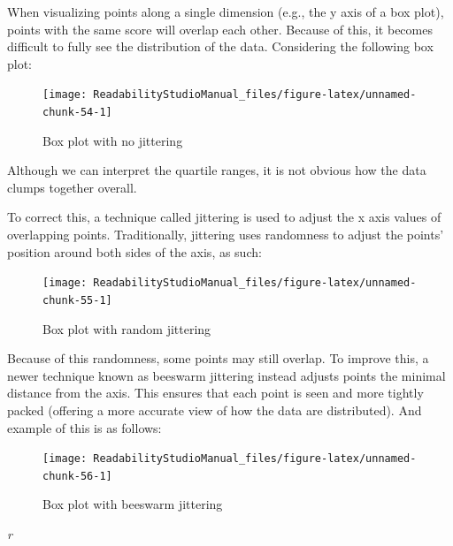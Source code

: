 \documentclass[
]{book}
\newenvironment{glsterm}
  {
  \bfseries
  }
  {
  }
\newenvironment{glsdef}
  {
  \noindent
  \flushleft
  \begin{adjustwidth}{2cm}{}
  }
  {
  \end{adjustwidth}
  }
\theoremstyle{definition}
\theoremstyle{definition}
\theoremstyle{definition}
\theoremstyle{definition}
\theoremstyle{remark}
\begin{document}
\begin{glsdef}

When visualizing points along a single dimension (e.g., the y axis of a box plot), points with the same score will overlap each other. Because of this, it becomes difficult to fully see the distribution of the data. Considering the following box plot:

\begin{figure}[H]

{\centering \texttt{[image: ReadabilityStudioManual\_files/figure-latex/unnamed-chunk-54-1]} 

}

\caption{Box plot with no jittering}\label{fig:unnamed-chunk-54}
\end{figure}

Although we can interpret the quartile ranges, it is not obvious how the data clumps together overall.

To correct this, a technique called jittering is used to adjust the x axis values of overlapping points. Traditionally, jittering uses randomness to adjust the points' position around both sides of the axis, as such:

\begin{figure}[H]

{\centering \texttt{[image: ReadabilityStudioManual\_files/figure-latex/unnamed-chunk-55-1]} 

}

\caption{Box plot with random jittering}\label{fig:unnamed-chunk-55}
\end{figure}

Because of this randomness, some points may still overlap. To improve this, a newer technique known as beeswarm jittering instead adjusts points the minimal distance from the axis. This ensures that each point is seen and more tightly packed (offering a more accurate view of how the data are distributed). And example of this is as follows:

\begin{figure}[H]

{\centering \texttt{[image: ReadabilityStudioManual\_files/figure-latex/unnamed-chunk-56-1]} 

}

\caption{Box plot with beeswarm jittering}\label{fig:unnamed-chunk-56}
\end{figure}

\end{glsdef}

\begin{glsterm}
\emph{r}

\end{glsterm}
\end{document}
